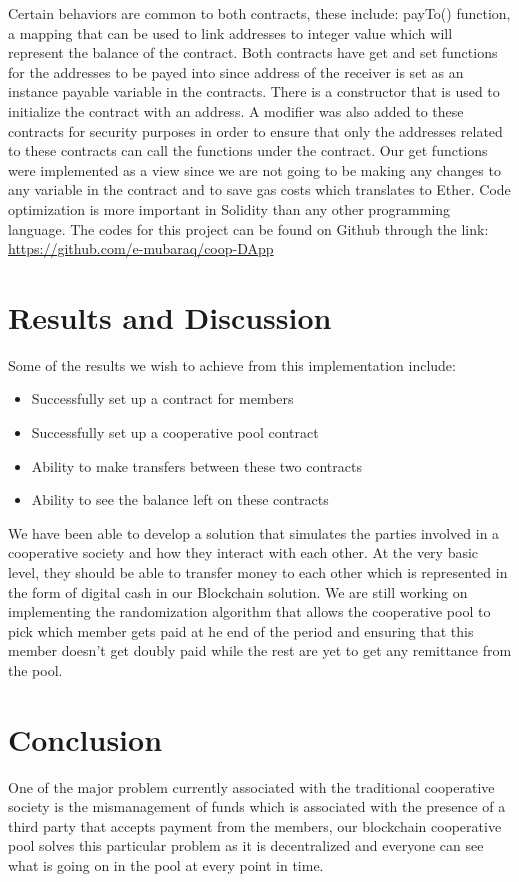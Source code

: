 \documentclass{article}
\begin{document}
\begin{flushleft}
Certain behaviors are common to both contracts, these  include: payTo() function, a mapping that can be used to link addresses to integer value which will represent the balance of the contract. Both contracts have get and set functions for the addresses to be payed into since address of the receiver is set as an instance payable variable in the contracts. There is a constructor that is used to initialize the contract with an address. A modifier was also added to these contracts for security purposes in order to ensure that only the addresses related to these contracts can call the functions under the contract. Our get functions were implemented as a view since we are not going to be making any changes to any variable in the contract and to save gas costs which translates to Ether. Code optimization is more important in Solidity than any other programming language. The codes for this project can be found on Github through the link: \url{https://github.com/e-mubaraq/coop-DApp}

\section{Results and Discussion}
Some of the results we wish to achieve from this implementation include:
\begin{itemize}
    \item Successfully set up a contract for members
    \item Successfully set up a cooperative pool contract
    \item Ability to make transfers between these two contracts
    \item Ability to see the balance left on these contracts
\end{itemize}
We have been able to develop a solution that simulates the parties involved in a cooperative society and how they interact with each other. At the very basic level, they should be able to transfer money to each other which is represented in the form of digital cash in our Blockchain solution. We are still working on implementing the randomization algorithm that allows the cooperative pool to pick which member gets paid at he end of the period and ensuring that this member doesn't get doubly paid while the rest are yet to get any remittance from the pool.

\section{Conclusion}
One of the major problem currently associated with the traditional cooperative society is the mismanagement of funds which is associated with the presence of a third party that accepts payment from the members, our blockchain cooperative pool  solves this particular problem as it is decentralized and everyone can see what is going on in the pool at every point in time.


\end{flushleft}
\end{document}
